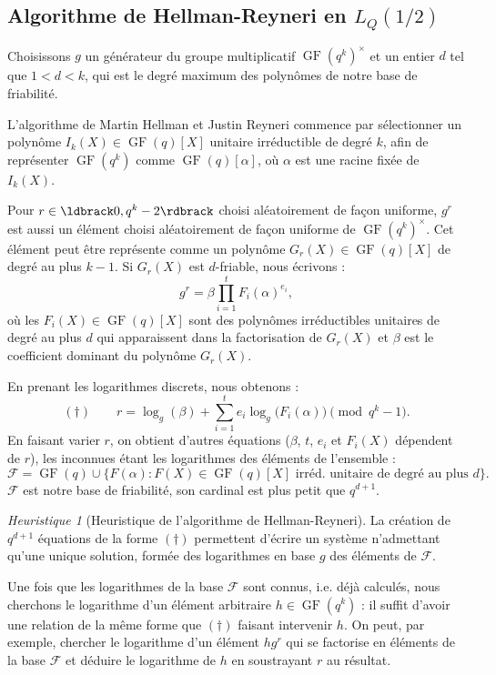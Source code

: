 \documentclass[a4paper, titlepage]{article}
\theoremstyle{definition}
\theoremstyle{remark}
\newtheorem{heur}[theo]{Heuristique}
\def\gf{\operatorname{GF}}
\begin{document}
\subsection{Algorithme de Hellman-Reyneri en $L_Q(1/2)$}

Choisissons $g$ un générateur du groupe multiplicatif $\gf(q^k)^\times$ et un entier $d$ tel que $1 < d < k$, qui est le degré maximum des polynômes de notre base de friabilité.

L'algorithme de Martin Hellman et Justin Reyneri \cite{hellman1982} commence par sélectionner un polynôme $I_k(X) \in \gf(q)[X]$ unitaire irréductible de degré $k$, afin de représenter $\gf(q^k)$ comme $\gf(q)[\alpha]$, où $\alpha$ est une racine fixée de $I_k(X)$.

Pour $r \in \ldbrack 0, q^k - 2 \rdbrack$ choisi aléatoirement de façon uniforme, $g^r$ est aussi un élément choisi aléatoirement de façon uniforme de $\gf(q^k)^\times$. Cet élément peut être représente comme un polynôme $G_r(X) \in \gf(q)[X]$ de degré au plus $k-1$. Si $G_r(X)$ est $d$-friable, nous écrivons :
$$g^r = \beta \prod_{i=1}^{t} F_i(\alpha)^{e_i},$$
où les $F_i(X)\in \gf(q)[X]$ sont des polynômes irréductibles unitaires de degré au plus $d$ qui apparaissent dans la factorisation de $G_r(X)$ et $\beta$ est le coefficient dominant du polynôme $G_r(X)$. 

En prenant les logarithmes discrets, nous obtenons :
$$(\dagger) \qquad r = \log_g(\beta) + \sum_{i=1}^t e_i\log_g\big(F_i(\alpha)\big) \pmod{q^k - 1}.$$
En faisant varier $r$, on obtient d'autres équations ($\beta$, $t$, $e_i$ et $F_i(X)$ dépendent de $r$), les inconnues étant les logarithmes des éléments de l'ensemble :
$$\mathcal{F} =  \gf(q) \cup \{F(\alpha) : F(X) \in \gf(q)[X] \text{ irréd. unitaire de degré au plus } d \}.$$
$\mathcal{F}$ est notre base de friabilité, son cardinal est plus petit que $q^{d+1}$.
\begin{heur}[Heuristique de l'algorithme de Hellman-Reyneri]
La création de $q^{d+1}$ équations de la forme $(\dagger)$ permettent d'écrire un système n'admettant qu'une unique solution, formée des logarithmes en base $g$ des éléments de $\mathcal{F}$.
\end{heur}

Une fois que les logarithmes de la base $\mathcal{F}$ sont connus, i.e. déjà calculés, nous cherchons le logarithme d'un élément arbitraire $h \in \gf(q^k)$ : il suffit d'avoir une relation de la même forme que $(\dagger)$ faisant intervenir $h$. On peut, par exemple, chercher le logarithme d'un élément $hg^r$ qui se factorise en éléments de la base $\mathcal{F}$ et déduire le logarithme de $h$ en soustrayant $r$ au résultat.
\end{document}

